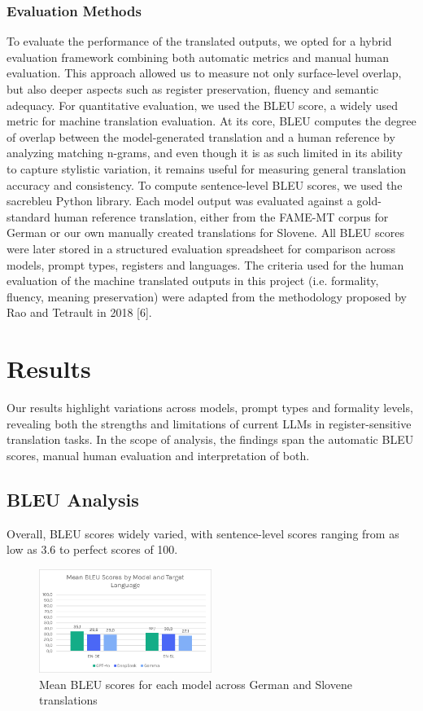 \documentclass[fleqn,moreauthors,10pt]{ds_report}
\begin{document}
\subsubsection*{Evaluation Methods}
To evaluate the performance of the translated outputs, we opted for a hybrid evaluation framework combining both automatic metrics and manual human evaluation. This approach allowed us to measure not only surface-level overlap, but also deeper aspects such as register preservation, fluency and semantic adequacy.
For quantitative evaluation, we used the BLEU score, a widely used metric for machine translation evaluation. At its core, BLEU computes the degree of overlap between the model-generated translation and a human reference by analyzing matching n-grams, and even though it is as such limited in its ability to capture stylistic variation, it remains useful for measuring general translation accuracy and consistency.
To compute sentence-level BLEU scores, we used the sacrebleu Python library. Each model output was evaluated against a gold-standard human reference translation, either from the FAME-MT corpus for German or our own manually created translations for Slovene. All BLEU scores were later stored in a structured evaluation spreadsheet for comparison across models, prompt types, registers and languages.
The criteria used for the human evaluation of the machine translated outputs in this project (i.e. formality, fluency, meaning preservation) were adapted from the methodology proposed by Rao and Tetrault in 2018 [6]. 



		\section*{Results}
		
	Our results highlight variations across models, prompt types and formality levels, revealing both the strengths and limitations of current LLMs in register-sensitive translation tasks. In the scope of analysis, the findings span the automatic BLEU scores, manual human evaluation and interpretation of both.
	
	\subsection*{BLEU Analysis}

		Overall, BLEU scores widely varied, with sentence-level scores ranging from as low as 3.6 to perfect scores of 100.
		
	\begin{figure}[h]
		\centering
		\includegraphics[width=0.5\textwidth]{image2.png}
		\caption{Mean BLEU scores for each model across German and Slovene translations}		
		\label{Figure 1}
	\end{figure}
		
\end{document}
